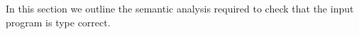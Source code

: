 In this section we outline the semantic analysis required to check that
the input program is type correct.

